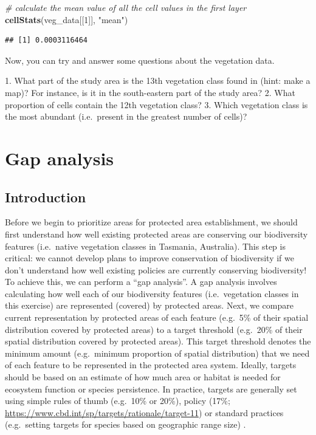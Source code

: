 \documentclass[12pt,]{book}
\makeatletter
\newenvironment{Shaded}{\begin{snugshade}}{\end{snugshade}}
\newcommand{\KeywordTok}[1]{\textcolor[rgb]{0.13,0.29,0.53}{\textbf{#1}}}
\newcommand{\DecValTok}[1]{\textcolor[rgb]{0.00,0.00,0.81}{#1}}
\newcommand{\StringTok}[1]{\textcolor[rgb]{0.31,0.60,0.02}{#1}}
\newcommand{\CommentTok}[1]{\textcolor[rgb]{0.56,0.35,0.01}{\textit{#1}}}
\newcommand{\NormalTok}[1]{#1}
\newenvironment{kframe}{%
\medskip{}
\setlength{\fboxsep}{.8em}
 \def\at@end@of@kframe{}%
 \ifinner\ifhmode%
  \def\at@end@of@kframe{\end{minipage}}%
  \begin{minipage}{\columnwidth}%
 \fi\fi%
 \def\FrameCommand##1{\hskip\@totalleftmargin \hskip-\fboxsep
 \colorbox{shadecolor}{##1}\hskip-\fboxsep
     \hskip-\linewidth \hskip-\@totalleftmargin \hskip\columnwidth}%
 \MakeFramed {\advance\hsize-\width
   \@totalleftmargin\z@ \linewidth\hsize
   \@setminipage}}%
 {\par\unskip\endMakeFramed%
 \at@end@of@kframe}
\newenvironment{rmdblock}[1]
  {
  \begin{itemize}
  \renewcommand{\labelitemi}{
    \raisebox{-.7\height}[0pt][0pt]{
      {\setkeys{Gin}{width=3em,keepaspectratio}\texttt{[image: images/\#1]}}
    }
  }
  \setlength{\fboxsep}{1em}
  \begin{kframe}
  \item
  }
  {
  \end{kframe}
  \end{itemize}
  }
\newenvironment{rmdquestion}
  {\begin{rmdblock}{question}}
  {\end{rmdblock}}
\makeatother
\begin{document}
\begin{Shaded}
\begin{Highlighting}[]
\CommentTok{# calculate the mean value of all the cell values in the first layer}
\KeywordTok{cellStats}\NormalTok{(veg_data[[}\DecValTok{1}\NormalTok{]], }\StringTok{"mean"}\NormalTok{)}
\end{Highlighting}
\end{Shaded}

\begin{verbatim}
## [1] 0.0003116464
\end{verbatim}

\clearpage

Now, you can try and answer some questions about the vegetation data.

\begin{rmdquestion} 1. What part of the study area is the 13th
vegetation class found in (hint: make a map)? For instance, is it in the
south-eastern part of the study area? 2. What proportion of cells
contain the 12th vegetation class? 3. Which vegetation class is the most
abundant (i.e.~present in the greatest number of cells)?
\end{rmdquestion}

\chapter{Gap analysis}\label{gap-analysis}

\section{Introduction}\label{introduction}

Before we begin to prioritize areas for protected area establishment, we
should first understand how well existing protected areas are conserving
our biodiversity features (i.e.~native vegetation classes in Tasmania,
Australia). This step is critical: we cannot develop plans to improve
conservation of biodiversity if we don't understand how well existing
policies are currently conserving biodiversity! To achieve this, we can
perform a ``gap analysis''. A gap analysis involves calculating how well
each of our biodiversity features (i.e.~vegetation classes in this
exercise) are represented (covered) by protected areas. Next, we compare
current representation by protected areas of each feature (e.g.~5\% of
their spatial distribution covered by protected areas) to a target
threshold (e.g.~20\% of their spatial distribution covered by protected
areas). This target threshold denotes the minimum amount (e.g.~minimum
proportion of spatial distribution) that we need of each feature to be
represented in the protected area system. Ideally, targets should be
based on an estimate of how much area or habitat is needed for ecosystem
function or species persistence. In practice, targets are generally set
using simple rules of thumb (e.g.~10\% or 20\%), policy (17\%;
\url{https://www.cbd.int/sp/targets/rationale/target-11}) or standard
practices (e.g.~setting targets for species based on geographic range
size) \citep{r1, r2}.
\end{document}

